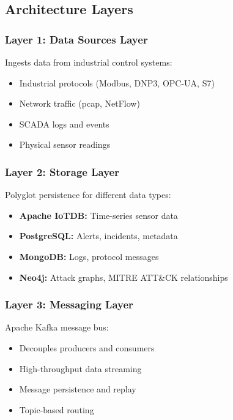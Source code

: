 \documentclass[12pt,a4paper]{article}
\begin{document}
\subsection{Architecture Layers}

\subsubsection{Layer 1: Data Sources Layer}

Ingests data from industrial control systems:
\begin{itemize}[leftmargin=1cm,itemsep=0pt]
    \item Industrial protocols (Modbus, DNP3, OPC-UA, S7)
    \item Network traffic (pcap, NetFlow)
    \item SCADA logs and events
    \item Physical sensor readings
\end{itemize}

\subsubsection{Layer 2: Storage Layer}

Polyglot persistence for different data types:
\begin{itemize}[leftmargin=1cm,itemsep=0pt]
    \item \textbf{Apache IoTDB:} Time-series sensor data
    \item \textbf{PostgreSQL:} Alerts, incidents, metadata
    \item \textbf{MongoDB:} Logs, protocol messages
    \item \textbf{Neo4j:} Attack graphs, MITRE ATT\&CK relationships
\end{itemize}

\subsubsection{Layer 3: Messaging Layer}

Apache Kafka message bus:
\begin{itemize}[leftmargin=1cm,itemsep=0pt]
    \item Decouples producers and consumers
    \item High-throughput data streaming
    \item Message persistence and replay
    \item Topic-based routing
\end{itemize}
\end{document}
